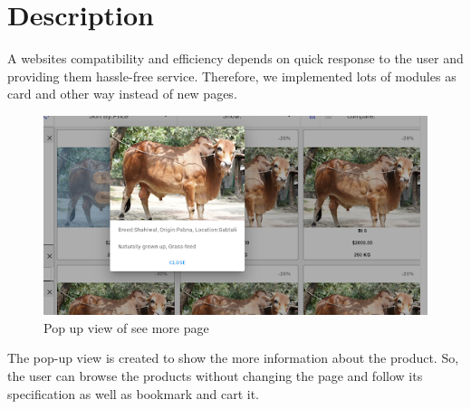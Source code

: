 \documentclass[a4paper,12pt]{report}
\begin{document}
\section*{Description}
A websites compatibility and efficiency depends on quick response to the user and providing them hassle-free service. Therefore, we implemented lots of modules as card and other way instead of new pages.
\begin{figure}[H]
\centering
\includegraphics[keepaspectratio, width=12cm]{pop_up.png}
\caption{Pop up view of see more page}
\label{popup}
\end{figure}
The pop-up view is created  to show the more information about the product. So, the user can browse the products without changing the page and follow its specification as well as bookmark and cart it.
\end{document}
